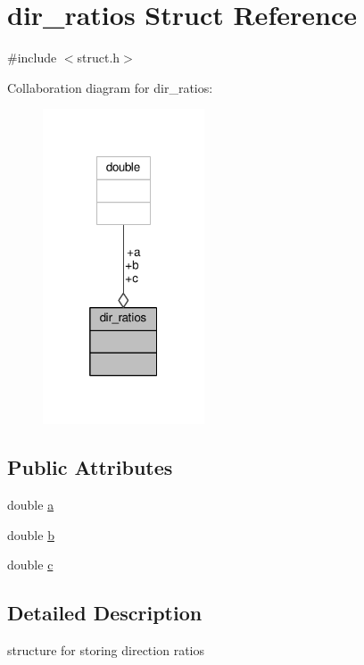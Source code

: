 \hypertarget{structdir__ratios}{}\section{dir\+\_\+ratios Struct Reference}
\label{structdir__ratios}


{\ttfamily \#include $<$struct.\+h$>$}



Collaboration diagram for dir\+\_\+ratios\+:
\nopagebreak
\begin{figure}[H]
\begin{center}
\leavevmode
\includegraphics[width=136pt]{structdir__ratios__coll__graph}
\end{center}
\end{figure}
\subsection*{Public Attributes}
\begin{DoxyCompactItemize}
\item 
double \hyperlink{structdir__ratios_a8cd0b45dd30ce975c1b2d7482fba81ac}{a}
\item 
double \hyperlink{structdir__ratios_a4e945589b5a219e39542121995e2799b}{b}
\item 
double \hyperlink{structdir__ratios_ab8485b7011be5c94b3050fd52b1b591d}{c}
\end{DoxyCompactItemize}


\subsection{Detailed Description}
structure for storing direction ratios 

